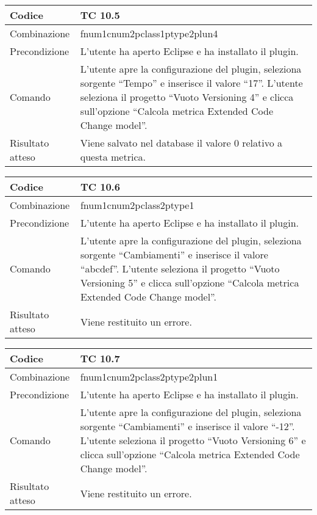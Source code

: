 \begin{table}[ht]
\begin{tabular}{|p{3cm}|p{9cm}|}
\hline
\cellcolor{lightgray}Codice				& TC 10.5								\\
\hline
\cellcolor{lightgray}Combinazione		& fnum1cnum2pclass1ptype2plun4									\\
\hline
\cellcolor{lightgray}Precondizione		& L'utente ha aperto Eclipse e ha installato il plugin.		\\
\hline
\cellcolor{lightgray}Comando			& L'utente apre la configurazione del plugin, seleziona sorgente ``Tempo'' e inserisce il valore ``17''. L'utente seleziona il progetto ``Vuoto Versioning 4''  e clicca sull'opzione ``Calcola metrica Extended Code Change model''.	\\
\hline
\cellcolor{lightgray}Risultato atteso	& Viene salvato nel database il valore 0 relativo a questa metrica.\\
\hline
\end{tabular}
\end{table}


\begin{table}[ht]
\begin{tabular}{|p{3cm}|p{9cm}|}
\hline
\cellcolor{lightgray}Codice				& TC 10.6								\\
\hline
\cellcolor{lightgray}Combinazione		& fnum1cnum2pclass2ptype1									\\
\hline
\cellcolor{lightgray}Precondizione		& L'utente ha aperto Eclipse e ha installato il plugin.		\\
\hline
\cellcolor{lightgray}Comando			& L'utente apre la configurazione del plugin, seleziona sorgente ``Cambiamenti'' e inserisce il valore ``abcdef''. L'utente seleziona il progetto ``Vuoto Versioning 5''  e clicca sull'opzione ``Calcola metrica Extended Code Change model''.	\\
\hline
\cellcolor{lightgray}Risultato atteso	& Viene restituito un errore.\\
\hline
\end{tabular}
\end{table}

\begin{table}[ht]
\begin{tabular}{|p{3cm}|p{9cm}|}
\hline
\cellcolor{lightgray}Codice				& TC 10.7								\\
\hline
\cellcolor{lightgray}Combinazione		& fnum1cnum2pclass2ptype2plun1									\\
\hline
\cellcolor{lightgray}Precondizione		& L'utente ha aperto Eclipse e ha installato il plugin.		\\
\hline
\cellcolor{lightgray}Comando			& L'utente apre la configurazione del plugin, seleziona sorgente ``Cambiamenti'' e inserisce il valore ``-12''. L'utente seleziona il progetto ``Vuoto Versioning 6''  e clicca sull'opzione ``Calcola metrica Extended Code Change model''.	\\
\hline
\cellcolor{lightgray}Risultato atteso	& Viene restituito un errore.\\
\hline
\end{tabular}
\end{table}

